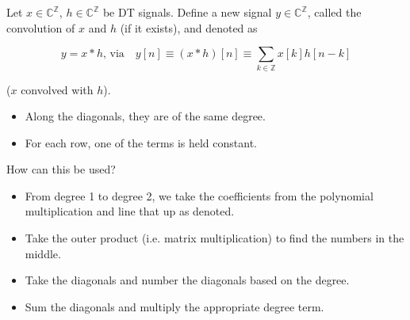 \begin{definition}
    Let \( x \in \mathbb{C}^{\mathbb{Z}} \), \( h \in \mathbb{C}^{\mathbb{Z}} \) be DT signals. Define a new signal \( y \in \mathbb{C}^{\mathbb{Z}} \), called the convolution of \( x \) and \( h \) (if it exists), and denoted as

    \begin{equation}
        y = x * h, \, \text{via} \quad y[n] \equiv (x * h)[n] \equiv \sum_{k \in \mathbb{Z}} x[k]h[n-k]
    \end{equation}

    (\( x \) convolved with \( h \)).

\end{definition}

\begin{example}
    \begin{itemize}
        \item Along the diagonals, they are of the same degree. 
        \item For each row, one of the terms is held constant. 
    \end{itemize}
    \vspace{1em}

    How can this be used?


    \begin{itemize}
        \item From degree 1 to degree 2, we take the coefficients from the polynomial multiplication and line that up as denoted. 
        \item Take the outer product (i.e. matrix multiplication) to find the numbers in the middle. 
        \item Take the diagonals and number the diagonals based on the degree.
        \item Sum the diagonals and multiply the appropriate degree term.
    \end{itemize}
\end{example}

